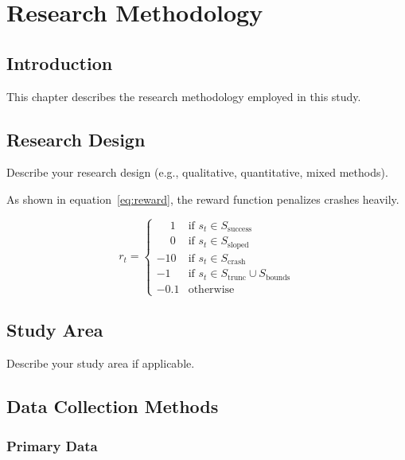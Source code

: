 
\chapter{Research Methodology}

\section{Introduction}

This chapter describes the research methodology employed in this study.

\section{Research Design}

Describe your research design (e.g., qualitative, quantitative, mixed methods).

As shown in equation~\ref{eq:reward}, the reward function penalizes crashes heavily.

\begin{equation}
\label{eq:reward}
r_t =
\begin{cases}
\phantom{-}1 & \text{if } s_t \in S_{\text{success}} \\
\phantom{-}0 & \text{if } s_t \in S_{\text{sloped}} \\
-10 & \text{if } s_t \in S_{\text{crash}} \\
-1 & \text{if } s_t \in S_{\text{trunc}} \cup S_{\text{bounds}} \\
-0.1 & \text{otherwise}
\end{cases}
\end{equation}



\section{Study Area}

Describe your study area if applicable.

\section{Data Collection Methods}

\subsection{Primary Data}

